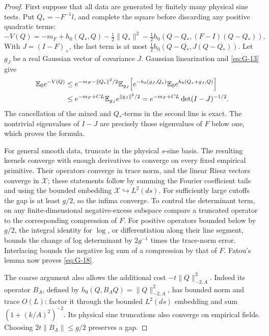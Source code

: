 \begin{proof}
First suppose that all data are generated by finitely many physical sine
tests. Put \(Q_*=-F^{-1}l\), and complete the square before discarding
any positive quadratic terms:
\[
 -V(Q)=-m_F+h_0(Q_*,Q)-\tfrac12\|Q_*\|^2
       -\tfrac12h_0(Q-Q_*,(F-I)(Q-Q_*)).
\]
With \(J=(I-F)_+\), the last term is at most
\(\tfrac12h_0(Q-Q_*,J(Q-Q_*))\). Let \(g_J\) be a real Gaussian
vector of covariance \(J\). Gaussian linearization and
\eqref{eq:G-13} give
\begin{align*}
 \mathbb E_0e^{-V(Q)}
 &\le e^{-m_F-\|Q_*\|^2/2}
   \mathbb E_{g_J}\!\left[e^{-h_0(g_J,Q_*)}
                      \mathbb E_0 e^{h_0(Q_*+g_J,Q)}\right]\\
 &\le e^{-m_F+CL}\mathbb E_{g_J}e^{\|g_J\|^2/2}
   =e^{-m_F+CL}\det(I-J)^{-1/2}.
\end{align*}
The cancellation of the mixed and \(Q_*\)-terms in the second line is
exact. The nontrivial eigenvalues of \(I-J\) are precisely those
eigenvalues of \(F\) below one, which proves the formula.

For general smooth data, truncate in the physical \(s\)-sine basis.
The resulting kernels converge with enough derivatives to converge on
every fixed empirical primitive. Their operators converge in trace norm,
and the linear Riesz vectors converge in \(\mathcal X\); these statements
follow by summing the Fourier coefficient tails and using the bounded
embedding \(\mathcal X\hookrightarrow L^2(ds)\). For sufficiently large
cutoffs the gap is at least \(g/2\), so the infima converge. To control
the determinant term, on any finite-dimensional negative-excess subspace
compare a truncated operator to the corresponding compression of \(F\).
For positive operators bounded below by \(g/2\), the integral identity
for \(\log\), or differentiation along their line segment, bounds the
change of log determinant by \(2g^{-1}\) times the trace-norm error.
Interlacing bounds the negative log sum of a compression by that of
\(F\). Fatou's lemma now proves \eqref{eq:G-18}.

The coarse argument also allows the additional cost
\(-t\|Q\|_{-2,A}^2\). Indeed its operator \(B_A\), defined by
\(h_0(Q,B_AQ)=\|Q\|_{-2,A}^2\), has bounded norm and trace
\(O(L)\): factor it through the bounded \(L^2(ds)\) embedding and
sum \((1+(k/A)^2)^{-2}\). Its physical sine truncations also converge
on empirical fields. Choosing \(2t\|B_A\|\le g/2\) preserves a gap.


\end{proof}
